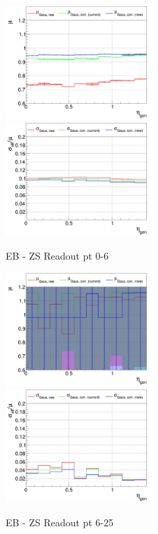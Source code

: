 
\begin{figure}
\includegraphics[width=0.495\textwidth]{./plots_pdf/ECAL_plots/plotsPU/EB/ZS/pdf/GENETA/EBZS_GENETA_0000_0006_MuOverBins.pdf}
\includegraphics[width=0.495\textwidth]{./plots_pdf/ECAL_plots/plotsPU/EB/ZS/pdf/GENETA/EBZS_GENETA_0000_0006_EffSigmaOverBins.pdf}
\caption{EB - ZS Readout pt 0-6}
\end{figure}

\begin{figure}
\includegraphics[width=0.495\textwidth]{./plots_pdf/ECAL_plots/plotsPU/EB/ZS/pdf/GENETA/EBZS_GENETA_0006_0025_MuOverBins.pdf}
\includegraphics[width=0.495\textwidth]{./plots_pdf/ECAL_plots/plotsPU/EB/ZS/pdf/GENETA/EBZS_GENETA_0006_0025_EffSigmaOverBins.pdf}
\caption{EB - ZS Readout pt 6-25}
\end{figure}

